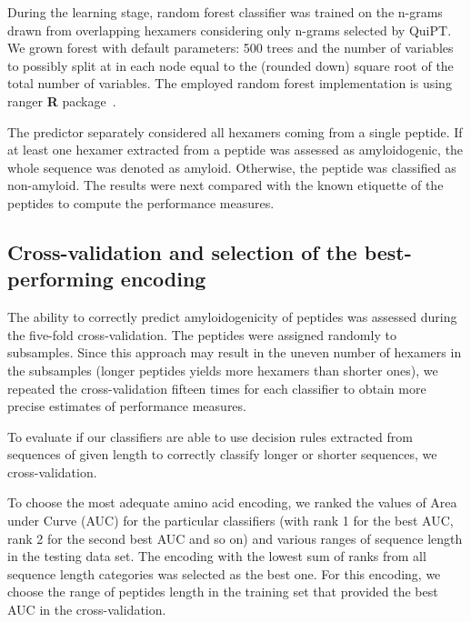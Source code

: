 \documentclass[a4,center,fleqn]{NAR}
\begin{document}
During the learning stage, random forest classifier was trained on the n-grams drawn 
from overlapping hexamers considering only n-grams selected by QuiPT. We grown forest with 
default parameters: 500 trees and the number of variables to possibly split at in each 
node equal to the (rounded down) square root of the total number of variables. The employed 
random forest implementation is using ranger \textbf{R} package~\citep{wright_ranger:_2015}.

  The predictor separately considered all hexamers coming from a single peptide. If at least 
one hexamer extracted from a peptide was assessed as amyloidogenic, the whole sequence was 
denoted as amyloid. Otherwise, the peptide was classified as non-amyloid. The results were 
next compared with the known etiquette of the peptides to compute the performance measures.


\subsection{Cross-validation and selection of the best-performing encoding}

The ability to correctly predict amyloidogenicity of peptides was assessed during 
the five-fold cross-validation. The peptides were assigned randomly to subsamples. 
Since this approach may result in the uneven number of hexamers in the subsamples 
(longer peptides yields more hexamers than shorter ones), we repeated the 
cross-validation fifteen times for each classifier to obtain more precise estimates 
of performance measures. 

  To evaluate if our classifiers are able to use decision rules extracted from 
sequences of given length to correctly classify longer or shorter sequences, we 
cross-validation.
%
%
  
  To choose the most adequate amino acid encoding, we ranked the values of Area under 
Curve (AUC) for the particular classifiers (with rank 1 for the best AUC, rank 2 for the second best AUC and so on) and various ranges of sequence length in the testing data set. The encoding with the lowest sum of ranks from all sequence length categories was selected as the best one. For this encoding, we choose the range of peptides length in the training set that provided the best AUC in the cross-validation.
%
%
\end{document}
